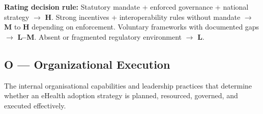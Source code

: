 \noindent\textbf{Rating decision rule:}
Statutory mandate + enforced governance + national strategy $\rightarrow$ \textbf{H}.
Strong incentives + interoperability rules without mandate $\rightarrow$ \textbf{M} to \textbf{H} depending on enforcement.
Voluntary frameworks with documented gaps $\rightarrow$ \textbf{L--M}.
Absent or fragmented regulatory environment $\rightarrow$ \textbf{L}.

\bigskip


\subsection*{O --- Organizational Execution}

\noindent The internal organisational capabilities and leadership practices that determine whether an
eHealth adoption strategy is planned, resourced, governed, and executed effectively.

